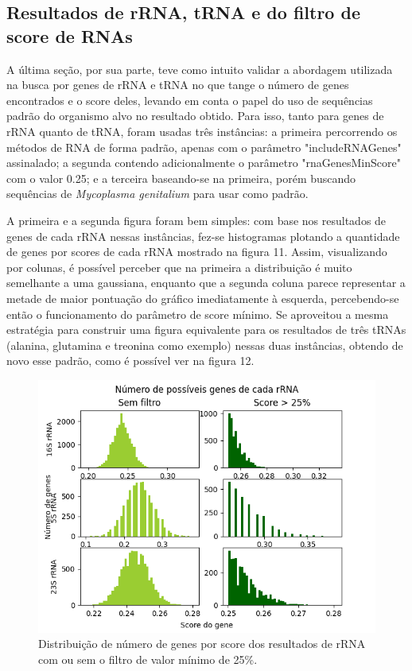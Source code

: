 \documentclass[brazilian,12pt,a4paper,final]{article}
\begin{document}
	 \vspace{0.5cm}
	
	\subsection{Resultados de rRNA, tRNA e do filtro de score de RNAs}
	 \vspace{0.5cm}
	A última seção, por sua parte, teve como intuito validar a abordagem utilizada na busca por genes de rRNA e tRNA no que tange o número de genes encontrados e o score deles, levando em conta o papel do uso de sequências padrão do organismo alvo no resultado obtido. Para isso, tanto para genes de rRNA quanto de tRNA, foram usadas três instâncias: a primeira percorrendo os métodos de RNA de forma padrão, apenas com o parâmetro "includeRNAGenes" assinalado; a segunda contendo adicionalmente o parâmetro "rnaGenesMinScore" com o valor 0.25; e a terceira baseando-se na primeira, porém buscando sequências de \textit{Mycoplasma genitalium} para usar como padrão.
	
	 \vspace{0.5cm}
	
	A primeira  e a segunda figura foram bem simples: com base nos resultados de genes de cada rRNA nessas instâncias, fez-se histogramas plotando a quantidade de genes por scores de cada rRNA mostrado na figura 11. Assim, visualizando por colunas, é possível perceber que na primeira a distribuição é muito semelhante a uma gaussiana, enquanto que a segunda coluna parece representar a metade de maior pontuação do gráfico imediatamente à esquerda, percebendo-se então o funcionamento do parâmetro de score mínimo. Se aproveitou a mesma estratégia para construir uma figura equivalente para os resultados de três tRNAs (alanina, glutamina e treonina como exemplo) nessas duas instâncias, obtendo de novo esse padrão, como é possível ver na figura 12.
	
	\begin{figure}[hbtp]
		\begin{center}
			\includegraphics[width=15cm]{../Figures/genesrRNA.png}
			\caption{Distribuição de número de genes por score dos resultados de rRNA com ou sem o filtro de valor mínimo de 25\%.}
			\label{fig}
		\end{center}
	\end{figure}
\end{document}

